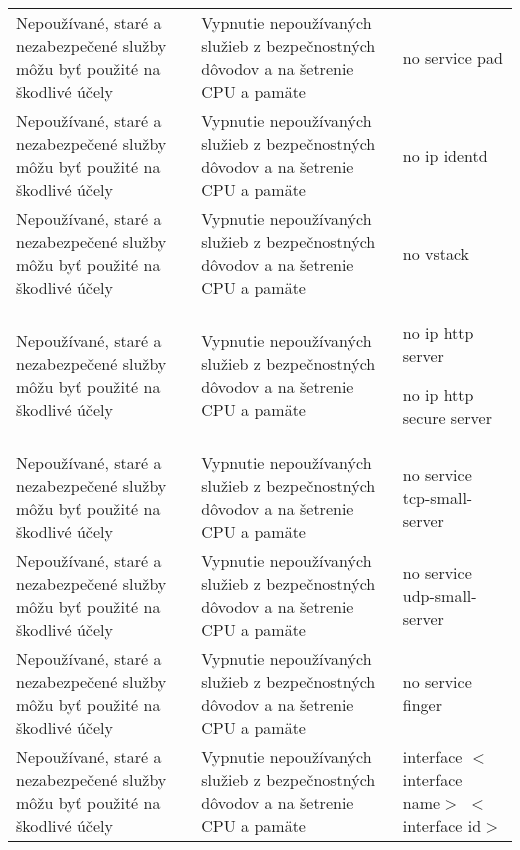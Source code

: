 \begin{longtable}[!htbp]{|L{10em}L{10em}>{\selectfont}L{34em}|}
	
	
	
	Nepoužívané, staré a nezabezpečené služby môžu byť použité na škodlivé účely	&Vypnutie nepoužívaných služieb z bezpečnostných dôvodov a na šetrenie CPU a pamäte 	&no service pad\\
	
	
	
	
	 Nepoužívané, staré a nezabezpečené služby môžu byť použité na škodlivé účely	&Vypnutie nepoužívaných služieb z bezpečnostných dôvodov a na šetrenie CPU a pamäte 	&no ip identd\\
	
	
	
	Nepoužívané, staré a nezabezpečené služby môžu byť použité na škodlivé účely	&Vypnutie nepoužívaných služieb z bezpečnostných dôvodov a na šetrenie CPU a pamäte 	&no vstack\\
	
	
	
	 Nepoužívané, staré a nezabezpečené služby môžu byť použité na škodlivé účely	&Vypnutie nepoužívaných služieb z bezpečnostných dôvodov a na šetrenie CPU a pamäte 	&no ip http server
	
	no ip http secure server\\
	
	
	
	Nepoužívané, staré a nezabezpečené služby môžu byť použité na škodlivé účely	&Vypnutie nepoužívaných služieb z bezpečnostných dôvodov a na šetrenie CPU a pamäte 	&no service tcp-small-server\\
	
	
	
	
	 Nepoužívané, staré a nezabezpečené služby môžu byť použité na škodlivé účely	&Vypnutie nepoužívaných služieb z bezpečnostných dôvodov a na šetrenie CPU a pamäte 	&no service udp-small-server\\
	
	
	
	Nepoužívané, staré a nezabezpečené služby môžu byť použité na škodlivé účely	&Vypnutie nepoužívaných služieb z bezpečnostných dôvodov a na šetrenie CPU a pamäte 	&no service finger\\
	
	
	
	
	 Nepoužívané, staré a nezabezpečené služby môžu byť použité na škodlivé účely	&Vypnutie nepoužívaných služieb z bezpečnostných dôvodov a na šetrenie CPU a pamäte 	&interface $<$interface name$>$ $<$interface id$>$
	

\end{longtable}
